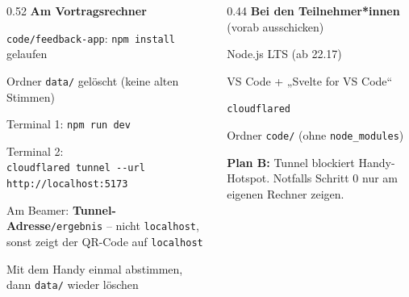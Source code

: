 \begin{lecturer}
\begin{frame}{}
  \scriptsize
  \begin{columns}[onlytextwidth,t]
    \begin{column}{0.52\textwidth}
      \textbf{Am Vortragsrechner}
      \begin{tugitemize}
        \item[\checkNo] \texttt{code/feedback-app}: \texttt{npm install} gelaufen
        \item[\checkNo] Ordner \texttt{data/} gelöscht (keine alten Stimmen)
        \item[\checkNo] Terminal 1: \texttt{npm run dev}
        \item[\checkNo] Terminal 2:\\ \texttt{cloudflared tunnel -{}-url http://localhost:5173}
        \item[\checkNo] Am Beamer: \textbf{Tunnel-Adresse}\texttt{/ergebnis} --
              nicht \texttt{localhost}, sonst zeigt der QR-Code auf \texttt{localhost}
        \item[\checkNo] Mit dem Handy einmal abstimmen, dann \texttt{data/} wieder löschen
      \end{tugitemize}
    \end{column}
    \begin{column}{0.44\textwidth}
      \textbf{Bei den Teilnehmer*innen} (vorab ausschicken)
      \begin{tugitemize}
        \item[\checkNo] Node.js LTS (ab 22.17)
        \item[\checkNo] VS Code + „Svelte for VS Code“
        \item[\checkNo] \texttt{cloudflared}
        \item[\checkNo] Ordner \texttt{code/} (ohne \texttt{node\_modules})
      \end{tugitemize}
      \vspace{0.4em}
      \textbf{Plan B:} Tunnel blockiert \textarrow{} Handy-Hotspot.
      Notfalls Schritt 0 nur am eigenen Rechner zeigen.
    \end{column}
  \end{columns}
\end{frame}
\end{lecturer}

